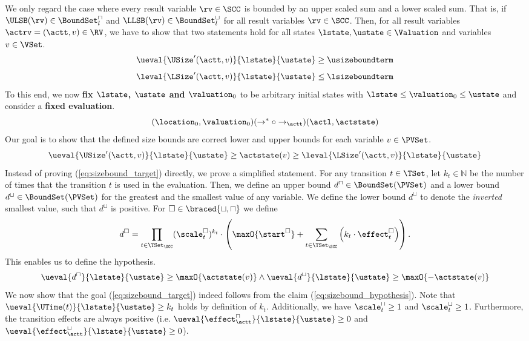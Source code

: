 We only regard the case where every result variable $\rv \in \SCC$ is bounded by an upper scaled sum and a lower scaled sum.
That is, if $\ULSB(\rv) \in \BoundSet^\sqcap_l$ and $\LLSB(\rv) \in \BoundSet^\sqcup_l$ for all result variables $\rv \in \SCC$.
Then, for all result variables $\actrv = (\actt, v) \in \RV$, we have to show that two statements hold for all states $\lstate, \ustate \in \Valuation$ and variables $v \in \VSet$.
\[ \ueval{\USize'(\actt, v)}{\lstate}{\ustate} \geq \usizeboundterm \]
\[ \leval{\LSize'(\actt, v)}{\lstate}{\ustate} \leq \lsizeboundterm \]
To this end, we now \textbf{fix $\lstate$, $\ustate$ and $\valuation_0$} to be arbitrary initial states with $\lstate \leq \valuation_0 \leq \ustate$ and consider a \textbf{fixed evaluation}.
\[ (\location_0, \valuation_0) (\rightarrow^* \circ \rightarrow_\actt) (\actl, \actstate) \]
Our goal is to show that the defined size bounds are correct lower and upper bounds for each variable $v \in \PVSet$.
\begin{equation} \label{eq:sizebound_target}
  \ueval{\USize'(\actt, v)}{\lstate}{\ustate} \geq \actstate(v) \geq \leval{\LSize'(\actt, v)}{\lstate}{\ustate}
\end{equation}
Instead of proving (\ref{eq:sizebound_target}) directly, we prove a simplified statement.
For any transition $t \in \TSet$, let $k_t \in \mathbb{N}$ be the number of times that the transition $t$ is used in the evaluation.
Then, we define an upper bound $d^\sqcap \in \BoundSet(\PVSet)$ and a lower bound $d^\sqcup \in \BoundSet(\PVSet)$ for the greatest and the smallest value of any variable.
We define the lower bound $d^\sqcup$ to denote the \emph{inverted} smallest value, such that $d^\sqcup$ is positive.
For $\square \in \braced{\sqcup, \sqcap}$ we define
\[ d^\square = \prod_{t \in \TSet_\SCC} (\scale^\square_t)^{k_t} \cdot \left( \maxO{\start^\square} + \sum_{t \in \TSet_\SCC} \left( k_t \cdot \effect^\square_t \right) \right). \]
This enables us to define the hypothesis.
\begin{equation} \label{eq:sizebound_hypothesis}
  \ueval{d^\sqcap}{\lstate}{\ustate} \geq \maxO{\actstate(v)} \wedge \ueval{d^\sqcup}{\lstate}{\ustate} \geq \maxO{-\actstate(v)}
\end{equation}
We now show that the goal (\ref{eq:sizebound_target}) indeed follows from the claim (\ref{eq:sizebound_hypothesis}).
Note that $\ueval{\UTime(t)}{\lstate}{\ustate} \geq k_t$ holds by definition of $k_t$.
Additionally, we have $\scale^\sqcap_t \geq 1$ and $\scale^\sqcup_t \geq 1$.
Furthermore, the transition effects are always positive (i.e. $\ueval{\effect^\sqcap_\actt}{\lstate}{\ustate} \geq 0$ and $\ueval{\effect^\sqcup_\actt}{\lstate}{\ustate} \geq 0$).
